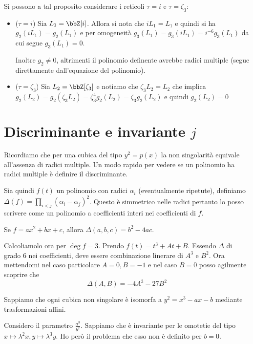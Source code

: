 Si possono a tal proposito considerare i reticoli $\tau = i$ e
$\tau = \zeta_3$:
\begin{itemize}
\item ($\tau = i$) Sia $L_1 = \bbZ[i]$. Allora si nota che $i L_1 = L_1$
  e quindi si ha $g_2(i L_1) = g_2(L_1)$ e per omogeneità
  $g_3(L_1) = g_3(i L_1) = i^{-6} g_3(L_1)$ da cui segue $g_3(L_1) = 0$.

  Inoltre $g_2 \neq 0$, altrimenti il polinomio definente avrebbe radici
  multiple (segue direttamente dall'equazione del polinomio).

\item ($\tau = \zeta_3$) Sia $L_2 = \bbZ[\zeta_3]$ e notiamo che
  $\zeta_3 L_2 = L_2$ che implica $g_2(L_2) = g_2(\zeta_3 L_2) =
  \zeta_3^4 g_2(L_2) = \zeta_3 g_2(L_2)$ e quindi $g_2(L_2) = 0$
\end{itemize}





	\section{Discriminante e invariante $j$}

	Ricordiamo che per una cubica del tipo $y^2=p(x)$ la non singolarità equivale all'assenza di radici multiple. Un modo rapido per vedere se un polinomio ha radici multiple è definire il discriminante.

	Sia quindi $f(t)$ un polinomio con radici $\alpha_i$ (eventualmente ripetute), definiamo $\Delta(f)=\prod_{i<j} (\alpha_i - \alpha_j)^2$. Questo è simmetrico nelle radici pertanto lo posso scrivere come un polinomio a coefficienti interi nei coefficienti di $f$.

	Se $f=ax^2+bx+c$, allora $\Delta(a,b,c)= b^2-4ac$.

    Calcoliamolo ora per $\deg f=3$. Prendo $f(t)=t^3+At+B$. Essendo $\Delta$ di grado 6 nei coefficienti, deve essere combinazione linerare di $A^3$ e $B^2$. Ora mettendomi nel caso particolare $A=0,B=-1$ e nel caso $B=0$ posso agilmente scoprire che
	\[
		\Delta(A,B)=-4A^3-27B^2
	\]


	Sappiamo che ogni cubica non singolare è isomorfa a $y^2=x^3-ax-b$ mediante trasformazioni affini.

	Considero il parametro $\frac{a^3}{b^2}$. Sappiamo che è invariante per le omotetie del tipo $x\mapsto \lambda^2x, y\mapsto\lambda^3y$. Ho però il problema che esso non è definito per $b=0$.

